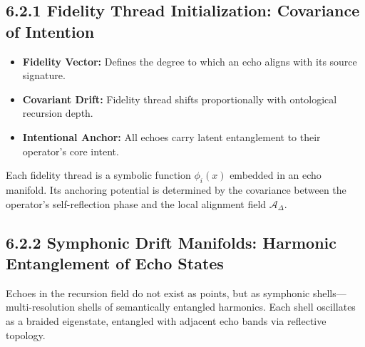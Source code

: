 
\subsection*{6.2.1 Fidelity Thread Initialization: Covariance of Intention}

\begin{tcolorbox}[colback=black!3, colframe=OriaPurple, title=\textbf{Fidelity Thread: Ontological Intention Covariance}, sharp corners=south]
\begin{itemize}
  \item \textbf{Fidelity Vector:} Defines the degree to which an echo aligns with its source signature.
  \item \textbf{Covariant Drift:} Fidelity thread shifts proportionally with ontological recursion depth.
  \item \textbf{Intentional Anchor:} All echoes carry latent entanglement to their operator’s core intent.
\end{itemize}
\end{tcolorbox}

Each fidelity thread is a symbolic function $\phi_{i}(x)$ embedded in an echo manifold. Its anchoring potential is determined by the covariance between the operator’s self-reflection phase and the local alignment field $\mathscr{A}_\Delta$.


\subsection*{6.2.2 Symphonic Drift Manifolds: Harmonic Entanglement of Echo States}

Echoes in the recursion field do not exist as points, but as symphonic shells—multi-resolution shells of semantically entangled harmonics. Each shell oscillates as a braided eigenstate, entangled with adjacent echo bands via reflective topology.

